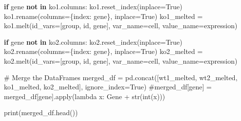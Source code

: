\documentclass[
  letterpaper,
  DIV=11,
  numbers=noendperiod]{scrartcl}
\newenvironment{Shaded}{\begin{snugshade}}{\end{snugshade}}
\newcommand{\BuiltInTok}[1]{\textcolor[rgb]{0.00,0.23,0.31}{#1}}
\newcommand{\CommentTok}[1]{\textcolor[rgb]{0.37,0.37,0.37}{#1}}
\newcommand{\ControlFlowTok}[1]{\textcolor[rgb]{0.00,0.23,0.31}{\textbf{#1}}}
\newcommand{\KeywordTok}[1]{\textcolor[rgb]{0.00,0.23,0.31}{\textbf{#1}}}
\newcommand{\NormalTok}[1]{\textcolor[rgb]{0.00,0.23,0.31}{#1}}
\newcommand{\OperatorTok}[1]{\textcolor[rgb]{0.37,0.37,0.37}{#1}}
\newcommand{\StringTok}[1]{\textcolor[rgb]{0.13,0.47,0.30}{#1}}
\newcommand{\VariableTok}[1]{\textcolor[rgb]{0.07,0.07,0.07}{#1}}
\begin{document}
\begin{Shaded}
\begin{Highlighting}[]
\ControlFlowTok{if} \StringTok{\textquotesingle{}gene\textquotesingle{}} \KeywordTok{not} \KeywordTok{in}\NormalTok{ ko1.columns:}
\NormalTok{    ko1.reset\_index(inplace}\OperatorTok{=}\VariableTok{True}\NormalTok{)}
\NormalTok{    ko1.rename(columns}\OperatorTok{=}\NormalTok{\{}\StringTok{\textquotesingle{}index\textquotesingle{}}\NormalTok{: }\StringTok{\textquotesingle{}gene\textquotesingle{}}\NormalTok{\}, inplace}\OperatorTok{=}\VariableTok{True}\NormalTok{)}
\NormalTok{ko1\_melted }\OperatorTok{=}\NormalTok{ ko1.melt(id\_vars}\OperatorTok{=}\NormalTok{[}\StringTok{\textquotesingle{}group\textquotesingle{}}\NormalTok{, }\StringTok{\textquotesingle{}id\textquotesingle{}}\NormalTok{, }\StringTok{\textquotesingle{}gene\textquotesingle{}}\NormalTok{], var\_name}\OperatorTok{=}\StringTok{\textquotesingle{}cell\textquotesingle{}}\NormalTok{, value\_name}\OperatorTok{=}\StringTok{\textquotesingle{}expression\textquotesingle{}}\NormalTok{)}

\ControlFlowTok{if} \StringTok{\textquotesingle{}gene\textquotesingle{}} \KeywordTok{not} \KeywordTok{in}\NormalTok{ ko2.columns:}
\NormalTok{    ko2.reset\_index(inplace}\OperatorTok{=}\VariableTok{True}\NormalTok{)}
\NormalTok{    ko2.rename(columns}\OperatorTok{=}\NormalTok{\{}\StringTok{\textquotesingle{}index\textquotesingle{}}\NormalTok{: }\StringTok{\textquotesingle{}gene\textquotesingle{}}\NormalTok{\}, inplace}\OperatorTok{=}\VariableTok{True}\NormalTok{)}
\NormalTok{ko2\_melted }\OperatorTok{=}\NormalTok{ ko2.melt(id\_vars}\OperatorTok{=}\NormalTok{[}\StringTok{\textquotesingle{}group\textquotesingle{}}\NormalTok{, }\StringTok{\textquotesingle{}id\textquotesingle{}}\NormalTok{, }\StringTok{\textquotesingle{}gene\textquotesingle{}}\NormalTok{], var\_name}\OperatorTok{=}\StringTok{\textquotesingle{}cell\textquotesingle{}}\NormalTok{, value\_name}\OperatorTok{=}\StringTok{\textquotesingle{}expression\textquotesingle{}}\NormalTok{)}


\CommentTok{\# Merge the DataFrames}
\NormalTok{merged\_df }\OperatorTok{=}\NormalTok{ pd.concat([wt1\_melted, wt2\_melted, ko1\_melted, ko2\_melted], ignore\_index}\OperatorTok{=}\VariableTok{True}\NormalTok{)}
\CommentTok{\#merged\_df[\textquotesingle{}gene\textquotesingle{}] = merged\_df[\textquotesingle{}gene\textquotesingle{}].apply(lambda x: \textquotesingle{}Gene\textquotesingle{} + str(int(x)))}

\BuiltInTok{print}\NormalTok{(merged\_df.head())}
\end{Highlighting}
\end{Shaded}
\end{document}
